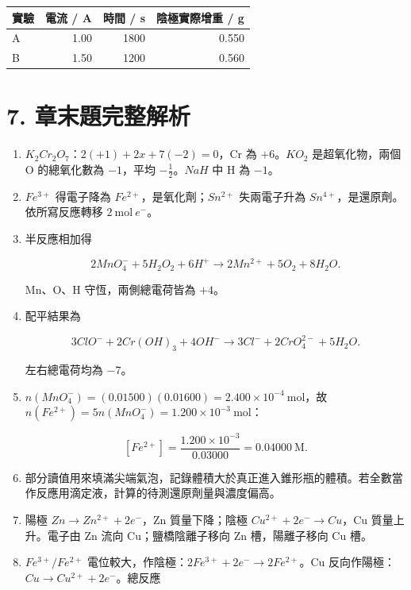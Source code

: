 \documentclass[11pt,a4paper]{article}
\newcounter{none}
\begin{document}
{\def\LTcaptype{none} %
\begin{longtable}[]{@{}lrrr@{}}
\toprule\noalign{}
實驗 & 電流 / A & 時間 / s & 陰極實際增重 / g \\
\midrule\noalign{}
\endhead
\bottomrule\noalign{}
\endlastfoot
A & 1.00 & 1800 & 0.550 \\
B & 1.50 & 1200 & 0.560 \\
\end{longtable}
}

\section{7. 章末題完整解析}\label{ux7ae0ux672bux984cux5b8cux6574ux89e3ux6790}

\begin{enumerate}
\def\labelenumi{\arabic{enumi}.}
\item
  \(K_2Cr_2O_7\)：\(2(+1)+2x+7(-2)=0\)，Cr 為 \(+6\)。\(KO_2\) 是超氧化物，兩個 O 的總氧化數為 \(-1\)，平均 \(-\tfrac12\)。\(NaH\) 中 H 為 \(-1\)。
\item
  \(Fe^{3+}\) 得電子降為 \(Fe^{2+}\)，是氧化劑；\(Sn^{2+}\) 失兩電子升為 \(Sn^{4+}\)，是還原劑。依所寫反應轉移 \(2\ \mathrm{mol}\ e^-\)。
\item
  半反應相加得

  \[
  2MnO_4^-+5H_2O_2+6H^+\rightarrow2Mn^{2+}+5O_2+8H_2O.
  \]

  Mn、O、H 守恆，兩側總電荷皆為 \(+4\)。
\item
  配平結果為

  \[
  3ClO^-+2Cr(OH)_3+4OH^-\rightarrow3Cl^-+2CrO_4^{2-}+5H_2O.
  \]

  左右總電荷均為 \(-7\)。
\item
  \(n(MnO_4^-)=(0.01500)(0.01600)=2.400\times10^{-4}\ \mathrm{mol}\)，故 \(n(Fe^{2+})=5n(MnO_4^-)=1.200\times10^{-3}\ \mathrm{mol}\)：

  \[
  [Fe^{2+}]=\frac{1.200\times10^{-3}}{0.03000}=0.04000\ \mathrm M.
  \]
\item
  部分讀值用來填滿尖端氣泡，記錄體積大於真正進入錐形瓶的體積。若全數當作反應用滴定液，計算的待測還原劑量與濃度偏高。
\item
  陽極 \(Zn\rightarrow Zn^{2+}+2e^-\)，Zn 質量下降；陰極 \(Cu^{2+}+2e^-\rightarrow Cu\)，Cu 質量上升。電子由 Zn 流向 Cu；鹽橋陰離子移向 Zn 槽，陽離子移向 Cu 槽。
\item
  \(Fe^{3+}/Fe^{2+}\) 電位較大，作陰極：\(2Fe^{3+}+2e^-\rightarrow2Fe^{2+}\)。Cu 反向作陽極：\(Cu\rightarrow Cu^{2+}+2e^-\)。總反應


\end{enumerate}
\end{document}
